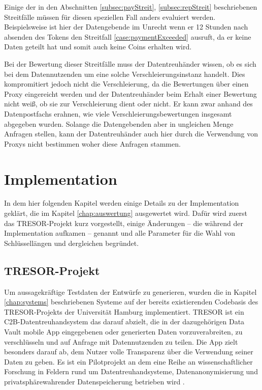 \documentclass[
	fontsize=12pt,
	headings=small,
	parskip=half,           %
	bibliography=totoc,
	numbers=noenddot,       %
	open=any,               %
]{scrreprt}
\begin{document}
Einige der in den Abschnitten \ref{subsec:payStreit}, \ref{subsec:repStreit} beschriebenen Streitfälle müssen für diesen speziellen Fall anders evaluiert werden. Beispielsweise ist hier der Datengebende im Unrecht wenn er 12 Stunden nach absenden des Tokens den Streitfall \ref{case:paymentExceeded} ausruft, da er keine Daten geteilt hat und somit auch keine Coins erhalten wird.

Bei der Bewertung dieser Streitfälle muss der Datentreuhänder wissen, ob es sich bei dem Datennutzenden um eine solche Verschleierungsinstanz handelt. Dies kompromitiert jedoch nicht die Verschleierung, da die Bewertungen über einen Proxy eingereicht werden und der Datentreuhänder beim Erhalt einer Bewertung nicht weiß, ob sie zur Verschleierung dient oder nicht. Er kann zwar anhand des Datenpostfachs erahnen, wie viele Verschleierungsbewertungen insgesamt abgegeben wurden. Solange die Datengebenden aber in ungleichen Menge Anfragen stellen, kann der Datentreuhänder auch hier durch die Verwendung von Proxys nicht bestimmen woher diese Anfragen stammen.




\chapter{Implementation}
\label{chap:impl}
In dem hier folgenden Kapitel werden einige Details zu der Implementation geklärt, die im Kapitel \ref{chap:auswertung} ausgewertet wird. Dafür wird zuerst das TRESOR-Projekt kurz vorgestellt, einige Änderungen -- die während der Implementation aufkamen -- genannt und alle Parameter für die Wahl von Schlüssellängen und dergleichen begründet.

\section{TRESOR-Projekt}
Um aussagekräftige Testdaten der Entwürfe zu generieren, wurden die in Kapitel \ref{chap:systems} beschriebenen Systeme auf der bereits existierenden Codebasis des TRESOR-Projekts der Universität Hamburg implementiert. TRESOR ist ein C2B-Datentreuhandsystem das darauf abzielt, die in der dazugehörigen Data Vault mobile App eingegebenen oder generierten Daten vorzuverabreiten, zu verschlüsseln und auf Anfrage mit Datennutzenden zu teilen. Die App zielt besonders darauf ab, dem Nutzer volle Transparenz über die Verwendung seiner Daten zu geben. Es ist ein Pilotprojekt an dem eine Reihe an wissenschaftlicher Forschung in Feldern rund um Datentreuhandsysteme, Datenanonymisierung und privatsphärewahrender Datenspeicherung betrieben wird \cite{TRESOR}.
\end{document}

